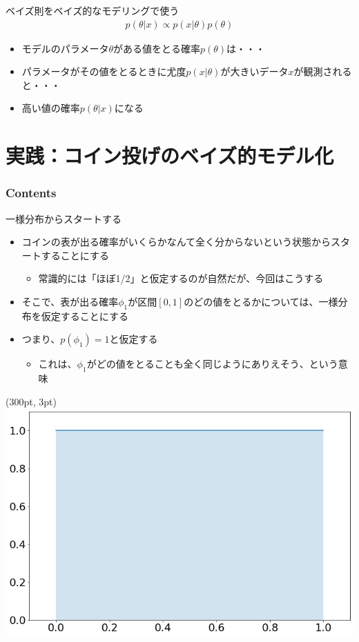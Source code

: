 \documentclass[aspectratio=169,unicode,dvipdfmx,14pt]{beamer}
\begin{document}
\begin{frame}{ベイズ則をベイズ的なモデリングで使う}
\vspace{-.4in}
{\Large
\begin{align}
p(\theta|x) \propto p(x|\theta)p(\theta)
\end{align}
}%
\vspace{-.2in}
\begin{itemize}
\item モデルのパラメータ$\theta$がある値をとる確率$p(\theta)$は・・・
\item パラメータがその値をとるときに尤度$p(x|\theta)$が大きいデータ$x$が観測されると・・・
\item 高い値の確率$p(\theta|x)$になる
\end{itemize}
\end{frame}

\section{実践：コイン投げのベイズ的モデル化}

\begin{frame}\frametitle{Contents}
\Large \tableofcontents[currentsection]
\end{frame}

\begin{frame}{一様分布からスタートする}
\begin{itemize}
\item コインの表が出る確率がいくらかなんて全く分からないという状態からスタートすることにする
\begin{itemize}
\item 常識的には「ほぼ1/2」と仮定するのが自然だが、今回はこうする
\end{itemize}
\item そこで、表が出る確率$\phi_1$が区間$[0,1]$のどの値をとるかについては、一様分布を仮定することにする
\item つまり、$p(\phi_1)=1$と仮定する
\begin{itemize}
\item これは、$\phi_1$がどの値をとることも全く同じようにありえそう、という意味
\end{itemize}
\end{itemize}
\begin{textblock*}{0.4\linewidth}(300pt, 3pt)
    \centering
    \includegraphics[width=0.5\linewidth]{uniform_dist.png}
\end{textblock*}
\end{frame}
\end{document}
